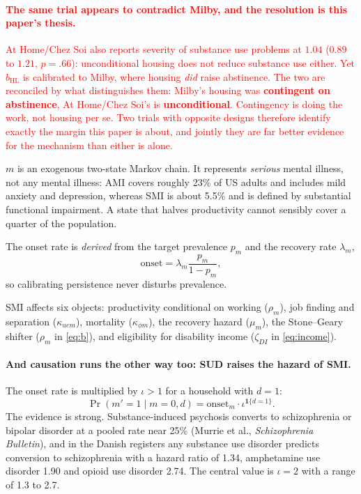 \documentclass[11pt]{article}
\newcommand{\nw}[1]{\textcolor{red}{#1}}
\newcommand{\ind}[1]{\mathbf{1}\{#1\}}
\begin{document}
\nw{\paragraph{The same trial appears to contradict Milby, and the resolution is
this paper's thesis.} At Home/Chez Soi also reports severity of substance use
problems at $1.04$ ($0.89$ to $1.21$, $p=.66$): unconditional housing does not
reduce substance use either. Yet $b_{\text{HL}}$ is calibrated to Milby, where
housing \emph{did} raise abstinence. The two are reconciled by what
distinguishes them: Milby's housing was \textbf{contingent on abstinence},
At Home/Chez Soi's is \textbf{unconditional}. Contingency is doing the work,
not housing per se. Two trials with opposite designs therefore identify exactly
the margin this paper is about, and jointly they are far better evidence for the
mechanism than either is alone.}

$m$ is an exogenous two-state Markov chain. It represents \emph{serious} mental
illness, not any mental illness: AMI covers roughly 23\% of US adults and
includes mild anxiety and depression, whereas SMI is about 5.5\% and is defined
by substantial functional impairment. A state that halves productivity cannot
sensibly cover a quarter of the population.

The onset rate is \emph{derived} from the target prevalence $p_m$ and the
recovery rate $\lambda_m$,
\begin{equation}
\text{onset}=\lambda_m\frac{p_m}{1-p_m},
\end{equation}
so calibrating persistence never disturbs prevalence.

SMI affects six objects: productivity conditional on working ($\rho_m$), job
finding and separation ($\kappa_{uem}$), mortality ($\kappa_{\phi m}$), the
recovery hazard ($\mu_m$), the Stone--Geary shifter ($\rho_m$ in \eqref{eq:b}),
and eligibility for disability income ($\zeta_{DI}$ in \eqref{eq:income}).

\paragraph{And causation runs the other way too: SUD raises the hazard of
SMI.} The onset rate is multiplied by $\iota>1$ for a household with $d=1$:
\begin{equation}
\Pr(m'=1\mid m=0,d)=\text{onset}_m\cdot\iota^{\ind{d=1}} .
\end{equation}
The evidence is strong. Substance-induced psychosis converts to schizophrenia or
bipolar disorder at a pooled rate near 25\% (Murrie et al., \emph{Schizophrenia
Bulletin}), and in the Danish registers any substance use disorder predicts
conversion to schizophrenia with a hazard ratio of 1.34, amphetamine use
disorder 1.90 and opioid use disorder 2.74. The central value is $\iota=2$ with a
range of 1.3 to 2.7.
\end{document}
